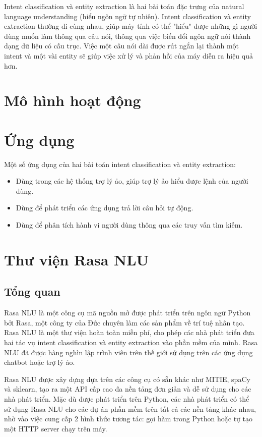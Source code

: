 Intent classification và entity extraction là hai bài toán đặc trưng của natural language understanding (hiểu ngôn ngữ tự nhiên). Intent classification và entity extraction thường đi cùng nhau, giúp máy tính có thể "hiểu" được những gì người dùng muốn làm thông qua câu nói, thông qua việc biến đổi ngôn ngữ nói thành dạng dữ liệu có cấu trục. Việc một câu nói dài được rút ngắn lại thành một intent và một vài entity sẽ giúp việc xử lý và phản hồi của máy diễn ra hiệu quả hơn.

\section{Mô hình hoạt động}

\section{Ứng dụng}

Một số ứng dụng của hai bài toán intent classification và entity extraction:

\begin{itemize}
    \item Dùng trong các hệ thống trợ lý ảo, giúp trợ lý ảo hiểu được lệnh của người dùng.
    \item Dùng để phát triển các ứng dụng trả lời câu hỏi tự động.
    \item Dùng để phân tích hành vi người dùng thông qua các truy vấn tìm kiếm.
\end{itemize}

\section{Thư viện Rasa NLU}

\subsection{Tổng quan}

Rasa NLU là một công cụ mã nguồn mở được phát triển trên ngôn ngữ Python bởi Rasa, một công ty của Đức chuyên làm các sản phẩm về trí tuệ nhân tạo. Rasa NLU là một thư viện hoàn toàn miễn phí, cho phép các nhà phát triển đưa hai tác vụ intent classification và entity extraction vào phần mềm của mình. Rasa NLU đã được hàng nghìn lập trình viên trên thế giới sử dụng trên các ứng dụng chatbot hoặc trợ lý ảo.

Rasa NLU được xây dựng dựa trên các công cụ có sẵn khác như MITIE, spaCy và sklearn, tạo ra một API cấp cao đa nền tảng đơn giản và dễ sử dụng cho các nhà phát triển. Mặc dù được phát triển trên Python, các nhà phát triển có thể sử dụng Rasa NLU cho các dự án phần mềm trên tất cả các nền tảng khác nhau, nhờ vào việc cung cấp 2 hình thức tương tác: gọi hàm trong Python hoặc tự tạo một HTTP server chạy trên máy.

